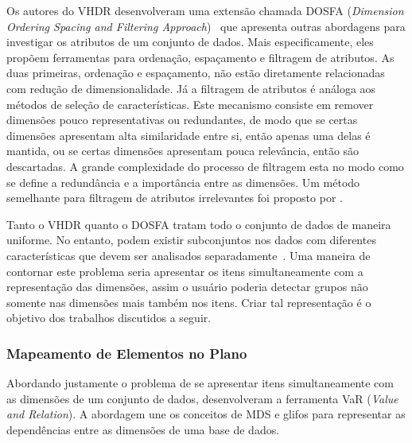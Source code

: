 Os autores do VHDR desenvolveram uma extensão chamada DOSFA
(\emph{Dimension Ordering Spacing and Filtering
Approach})~\cite{DOSFA} que apresenta outras abordagens para
investigar os atributos de um conjunto de dados. Mais
especificamente, eles propõem ferramentas para ordenação,
espaçamento e filtragem de atributos. As duas primeiras,
ordenação e espaçamento, não estão diretamente relacionadas
com redução de dimensionalidade. Já a filtragem de atributos
é análoga aos métodos de seleção de características. Este
mecanismo consiste em remover dimensões pouco
representativas ou redundantes, de modo que se certas
dimensões apresentam alta similaridade entre si, então
apenas uma delas é mantida, ou se certas dimensões
apresentam pouca relevância, então são descartadas. A grande
complexidade do processo de filtragem esta no modo como se
define a redundância e a importância entre as dimensões. Um
método semelhante para filtragem de atributos irrelevantes
foi proposto por \citet{Artero2006}.

Tanto o VHDR quanto o DOSFA tratam todo o conjunto de dados
de maneira uniforme. No entanto, podem existir subconjuntos
nos dados com diferentes características que devem ser
analisados separadamente~\cite{May2011}. Uma maneira de
contornar este problema seria apresentar os itens
simultaneamente com a representação das dimensões, assim o
usuário poderia detectar grupos não somente nas dimensões
mais também nos itens. Criar tal representação é o objetivo
dos trabalhos discutidos a seguir.

\subsubsection{Mapeamento de Elementos no Plano}

Abordando justamente o problema de se apresentar itens
simultaneamente com as dimensões de um conjunto de dados,
\citet{Yang2004} desenvolveram a ferramenta VaR (\emph{Value and
Relation}). A abordagem une os conceitos de MDS e glifos para
representar as dependências entre as dimensões de uma base
de dados. 

